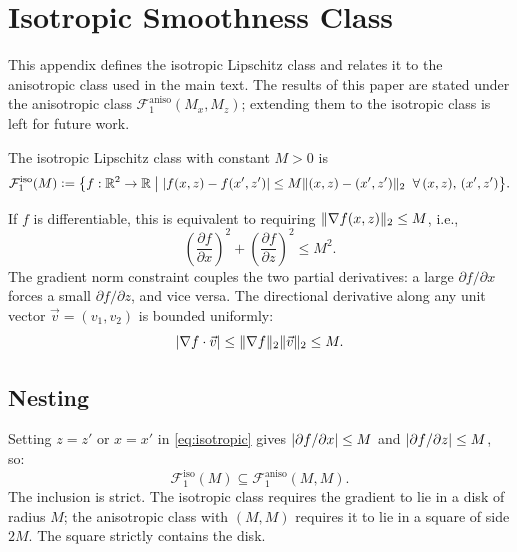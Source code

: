 \section{Isotropic Smoothness Class}\label{sec:appendix:isotropic}

This appendix defines the isotropic Lipschitz class and relates it to the anisotropic class used in the main text.
The results of this paper are stated under the anisotropic class $\mathcal{F}_1^{\mathrm{aniso}}(M_x, M_z)$; extending them to the isotropic class is left for future work.

\begin{definition}\label{def:isotropic}
	The isotropic Lipschitz class with constant $M > 0$ is
	\begin{equation}\label{eq:isotropic}
		\mathcal{F}_1^{\mathrm{iso}}(M) \vcentcolon= \bigl\{ f : \mathbb{R}^2 \to \mathbb{R} \;\big|\; \lvert f(x,z) - f(x',z')\rvert \leq M \lVert(x,z) - (x',z')\rVert_2 \;\; \forall\, (x,z),\, (x',z') \bigr\}.
	\end{equation}
\end{definition}

If $f$ is differentiable, this is equivalent to requiring $\lVert\nabla f(x,z)\rVert_2 \leq M$, i.e.,
\begin{equation}\label{eq:iso_gradient}
	\left(\frac{\partial f}{\partial x}\right)^2 + \left(\frac{\partial f}{\partial z}\right)^2 \leq M^2.
\end{equation}
The gradient norm constraint couples the two partial derivatives: a large $\partial f / \partial x$ forces a small $\partial f / \partial z$, and vice versa.
The directional derivative along any unit vector $\vec{v} = (v_1, v_2)$ is bounded uniformly:
\begin{equation}\label{eq:iso_directional}
	\lvert\nabla f \cdot \vec{v}\rvert \leq \lVert\nabla f\rVert_2 \lVert\vec{v}\rVert_2 \leq M.
\end{equation}


\subsection*{Nesting}

Setting $z = z'$ or $x = x'$ in \eqref{eq:isotropic} gives $\lvert\partial f / \partial x\rvert \leq M$ and $\lvert\partial f / \partial z\rvert \leq M$, so:
\begin{equation}\label{eq:iso_subset_aniso}
	\mathcal{F}_1^{\mathrm{iso}}(M) \subseteq \mathcal{F}_1^{\mathrm{aniso}}(M, M).
\end{equation}
The inclusion is strict.
The isotropic class requires the gradient to lie in a disk of radius $M$; the anisotropic class with $(M, M)$ requires it to lie in a square of side $2M$.
The square strictly contains the disk.

